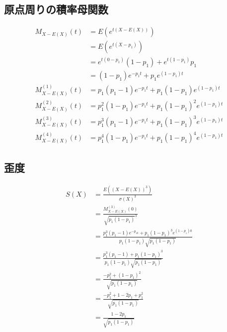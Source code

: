 \documentclass[dvipdfmx]{jsarticle}
\begin{document}
 \subsection{原点周りの積率母関数}
 \begin{align}
  M_{X-E\left(X\right)}\left(t\right)&=E\left(e^{t\left(X-E\left(X\right)\right)}\right)\nonumber\\
  &=E\left(e^{t\left(X-p_1\right)}\right)\nonumber\\
  &=e^{t\left(0-p_1\right)}\left(1-p_1\right)+e^{t\left(1-p_1\right)}p_1\nonumber\\
  &=\left(1-p_1\right)e^{-p_1t}+p_1e^{\left(1-p_1\right)t}\nonumber\\
  M_{X-E\left(X\right)}^{\left(1\right)}\left(t\right)&=p_1\left(p_1-1\right)e^{-p_1t}+p_1\left(1-p_1\right)e^{\left(1-p_1\right)t}\\
  M_{X-E\left(X\right)}^{\left(2\right)}\left(t\right)&=p_1^2\left(1-p_1\right)e^{-p_1t}+p_1\left(1-p_1\right)^2e^{\left(1-p_1\right)t}\\
  M_{X-E\left(X\right)}^{\left(3\right)}\left(t\right)&=p_1^3\left(p_1-1\right)e^{-p_1t}+p_1\left(1-p_1\right)^3e^{\left(1-p_1\right)t}\\
  M_{X-E\left(X\right)}^{\left(4\right)}\left(t\right)&=p_1^4\left(1-p_1\right)e^{-p_1t}+p_1\left(1-p_1\right)^4e^{\left(1-p_1\right)t}
 \end{align}
 \subsection{歪度}
 \begin{align}
  S\left(X\right)&=\frac{E\left(\left(X-E\left(X\right)\right)^3\right)}{\sigma\left(X\right)^3}\nonumber\\
  &=\frac{M_{X-E\left(X\right)}^{\left(3\right)}\left(0\right)}{\sqrt{p_1\left(1-p_1\right)}^3}\nonumber\\
  &=\frac{p_1^3\left(p_1-1\right)e^{-p_10}+p_1\left(1-p_1\right)^3e^{\left(1-p_1\right)0}}{p_1\left(1-p_1\right)\sqrt{p_1\left(1-p_1\right)}}\nonumber\\
  &=\frac{p_1^3\left(p_1-1\right)+p_1\left(1-p_1\right)^3}{p_1\left(1-p_1\right)\sqrt{p_1\left(1-p_1\right)}}\nonumber\\
  &=\frac{-p_1^2+\left(1-p_1\right)^2}{\sqrt{p_1\left(1-p_1\right)}}\nonumber\\
  &=\frac{-p_1^2+1-2p_1+p_1^2}{\sqrt{p_1\left(1-p_1\right)}}\nonumber\\
  &=\frac{1-2p_1}{\sqrt{p_1\left(1-p_1\right)}}
 \end{align}
\end{document}
